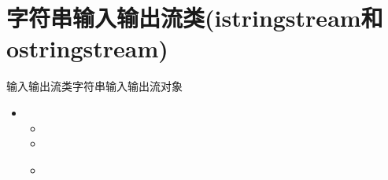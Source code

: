 \section[输入输出流类]{字符串输入输出流类(istringstream和ostringstream)}\label{sec:chap09-sec06}
\begin{frame}[t, fragile]{输入输出流类}{字符串输入输出流对象}%
  \stretchon
  \begin{itemize}
  \item {}
    \begin{itemize}
    \item {}
    \item {}
    \item {}\\
      \hspace{22ex} 
    \end{itemize}
  \end{itemize}
  \stretchoff
\end{frame}

